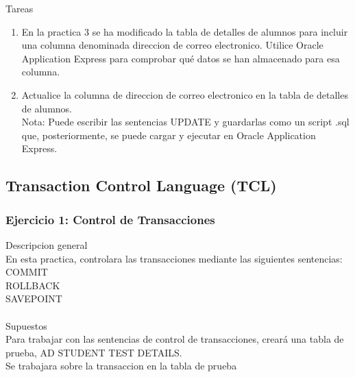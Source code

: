 \documentclass[12pt,letterpaper]{article}
\begin{document}
Tareas\\
\begin{enumerate}[1.]
    \item En la practica 3 se ha modificado la tabla de detalles de alumnos para incluir una columna denominada direccion de correo electronico. Utilice Oracle Application Express para comprobar qué datos se han almacenado para esa columna.  
     \item Actualice la columna de direccion de correo electronico en la tabla de detalles de alumnos.\\
    Nota: Puede escribir las sentencias UPDATE y guardarlas como un script .sql que, posteriormente, se puede cargar y ejecutar en Oracle Application Express.\\
    
		\end{enumerate}





\newpage
\subsection{Transaction Control Language (TCL)} 


\subsubsection{Ejercicio 1: Control de Transacciones} 
Descripcion general  \\
En esta practica, controlara las transacciones mediante las siguientes sentencias: \\
COMMIT \\
ROLLBACK \\
SAVEPOINT \\
 \\
Supuestos\\
Para trabajar con las sentencias de control de transacciones, creará una tabla de prueba, AD STUDENT TEST DETAILS.\\
Se trabajara sobre la transaccion en la tabla de prueba\\
\end{document}

